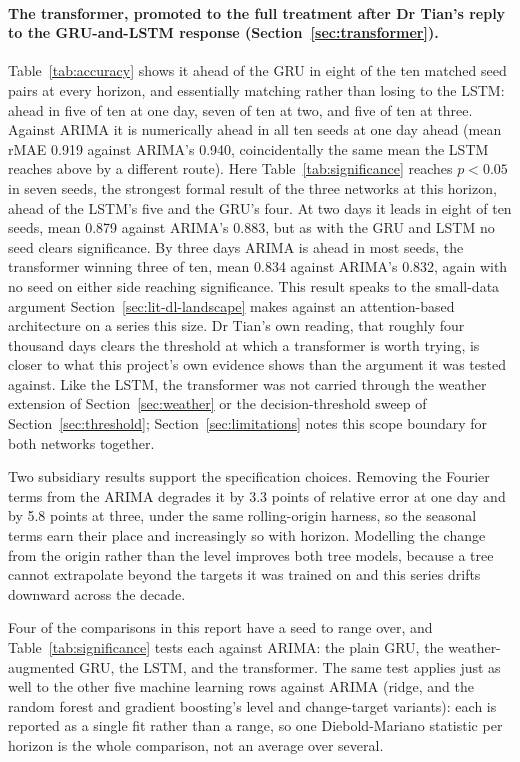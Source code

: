 \documentclass[12pt,a4paper]{report}
\begin{document}
\paragraph{The transformer, promoted to the full treatment after Dr Tian's
reply to the GRU-and-LSTM response (Section~\ref{sec:transformer}).}
Table~\ref{tab:accuracy} shows it ahead of the GRU in eight of the ten matched seed pairs at every horizon, and essentially matching rather than losing to the LSTM: ahead in five of ten at one day, seven of ten at two, and five of ten at three. Against ARIMA it is numerically ahead in all ten seeds at one day ahead (mean rMAE 0.919 against ARIMA's 0.940, coincidentally the same mean the LSTM reaches above by a different route). Here Table~\ref{tab:significance} reaches $p<0.05$ in seven seeds, the strongest formal result of the three networks at this horizon, ahead of the LSTM's five and the GRU's four. At two days it leads in eight of ten seeds, mean 0.879 against ARIMA's 0.883, but as with the GRU and LSTM no seed clears significance. By three days ARIMA is ahead in most seeds, the transformer winning three of ten, mean 0.834 against ARIMA's 0.832, again with no seed on either side reaching significance. This result speaks to the small-data argument Section~\ref{sec:lit-dl-landscape} makes against an attention-based architecture on a series this size. Dr Tian's own reading, that roughly four thousand days clears the threshold at which a transformer is worth trying, is closer to what this project's own evidence shows than the argument it was tested against. Like the LSTM, the transformer was not carried through the weather extension of Section~\ref{sec:weather} or the decision-threshold sweep of Section~\ref{sec:threshold}; Section~\ref{sec:limitations} notes this scope boundary for both networks together.

Two subsidiary results support the specification choices. Removing the Fourier
terms from the ARIMA degrades it by 3.3 points of relative error at one day and
by 5.8 points at three, under the same rolling-origin harness, so the seasonal
terms earn their place and increasingly so with horizon. Modelling the change
from the origin rather than the level improves
both tree models, because a tree cannot extrapolate beyond the targets it was
trained on and this series drifts downward across the decade.

Four of the comparisons in this report have a seed to range over, and Table~\ref{tab:significance} tests each against ARIMA: the plain GRU, the weather-augmented GRU, the LSTM, and the transformer. The same test applies just as well to the other five machine learning rows against ARIMA (ridge, and the random forest and gradient boosting's level and change-target variants): each is reported as a single fit rather than a range, so one Diebold-Mariano statistic per horizon is the whole comparison, not an average over several.
\end{document}

